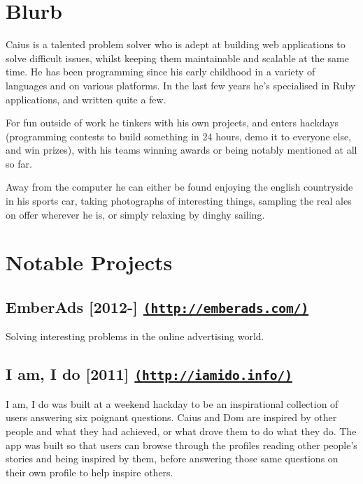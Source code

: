 \documentclass[letterpaper]{article}
\def\name{Caius Durling}
\begin{document}
\rightline{\huge \name}


\section*{Blurb}

Caius is a talented problem solver who is adept at building web applications to solve difficult issues, whilst keeping them maintainable and scalable at the same time. He has been programming since his early childhood in a variety of languages and on various platforms. In the last few years he's specialised in Ruby applications, and written quite a few.

For fun outside of work he tinkers with his own projects, and enters hackdays (programming contests to build something in 24 hours, demo it to everyone else, and win prizes), with his teams winning awards or being notably mentioned at all so far.

Away from the computer he can either be found enjoying the english countryside in his sports car, taking photographs of interesting things, sampling the real ales on offer wherever he is, or simply relaxing by dinghy sailing.

\section*{Notable Projects}

\subsection*{EmberAds [2012-\the\year] \href{http://emberads.com/}{\tt (http://emberads.com/)}} %
\label{sub:emberads}

Solving interesting problems in the online advertising world.


\subsection*{I am, I do [2011] \href{http://iamido.info/}{\tt (http://iamido.info/)}} %
\label{sub:i_am_i_do}

I am, I do was built at a weekend hackday to be an inspirational collection of users answering six poignant questions. Caius and Dom are inspired by other people and what they had achieved, or what drove them to do what they do. The app was built so that users can browse through the profiles reading other people's stories and being inspired by them, before answering those same questions on their own profile to help inspire others.
\end{document}
